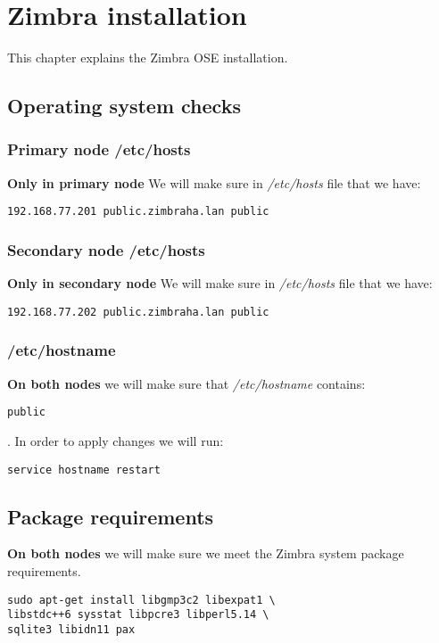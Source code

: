 

\chapter{Zimbra installation}
\label{chap:zimbra-installation}
This chapter explains the Zimbra OSE installation.

\section {Operating system checks}
\subsection {Primary node /etc/hosts}
\textbf{Only in primary node}
We will make sure in \textit{/etc/hosts} file that we have:

\begin{verbatim}
192.168.77.201 public.zimbraha.lan public
\end{verbatim}
\subsection {Secondary node /etc/hosts}
\textbf{Only in secondary node}
We will make sure in \textit{/etc/hosts} file that we have:

\begin{verbatim}
192.168.77.202 public.zimbraha.lan public
\end{verbatim}
\subsection {/etc/hostname}
\textbf{On both nodes} we will make sure that \textit{/etc/hostname} contains:

\begin{verbatim}
public
\end{verbatim}
. In order to apply changes we will run:
\begin{verbatim}
service hostname restart
\end{verbatim}

\section {Package requirements}
\textbf{On both nodes} we will make sure we meet the Zimbra system package requirements.

\begin{verbatim}
sudo apt-get install libgmp3c2 libexpat1 \
libstdc++6 sysstat libpcre3 libperl5.14 \
sqlite3 libidn11 pax
\end{verbatim}

